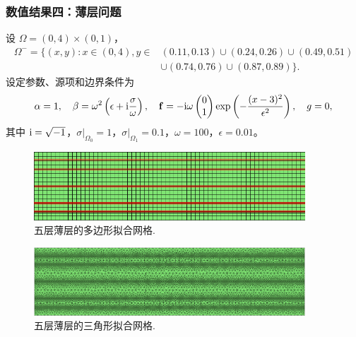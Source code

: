 \documentclass[notheorems,serif]{beamer}
\begin{document}
\begin{frame}
\end{frame}

\begin{frame}
    \frametitle{数值结果四：薄层问题}
\small
设 $\Omega=(0, 4)\times(0, 1)$，
$$
\begin{aligned}
\Omega^- =
\{(x, y) : x \in (0, 4),
y \in & (0.11, 0.13)\cup(0.24, 0.26)
\cup(0.49, 0.51)\\
& \cup(0.74,
0.76)\cup(0.87, 0.89)\}.
\end{aligned}
$$
设定参数、源项和边界条件为
$$
\alpha = 1,\quad \beta = \omega^2\left(\epsilon + {\rm i} \frac{\sigma}{\omega}\right), \quad {\bf f} = -{\rm i}\omega\begin{pmatrix}
0\\
1
\end{pmatrix} \exp\left(-\frac{(x-3)^2}{\epsilon^2}\right),\quad g = 0,
$$
其中 ${\rm i} = \sqrt{-1}$，$\sigma|_{\Omega_0}=1$，$\sigma|_{\Omega_1}=0.1$，$\omega = 100$，$\epsilon=0.01$。
\end{frame}
\begin{frame}
\begin{figure}[!h]
\centering
\includegraphics[width=4in]{../figures/maxwell/five_layer_interface.pdf}
\caption{五层薄层的多边形拟合网格.}
\end{figure}
\begin{figure}[!h]
\centering
\includegraphics[width=4in]{../figures/maxwell/mesh_five_layers.png}
\caption{五层薄层的三角形拟合网格.}
\end{figure}
\end{frame}
\end{document}

